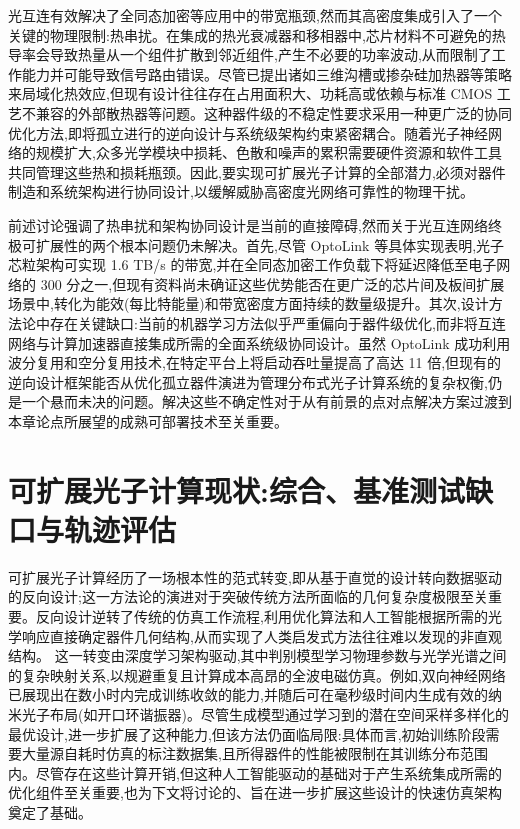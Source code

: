 \documentclass[11pt]{article}
\begin{document}
光互连有效解决了全同态加密等应用中的带宽瓶颈,然而其高密度集成引入了一个关键的物理限制:热串扰。在集成的热光衰减器和移相器中,芯片材料不可避免的热导率会导致热量从一个组件扩散到邻近组件,产生不必要的功率波动,从而限制了工作能力并可能导致信号路由错误。尽管已提出诸如三维沟槽或掺杂硅加热器等策略来局域化热效应,但现有设计往往存在占用面积大、功耗高或依赖与标准 CMOS 工艺不兼容的外部散热器等问题。这种器件级的不稳定性要求采用一种更广泛的协同优化方法,即将孤立进行的逆向设计与系统级架构约束紧密耦合。随着光子神经网络的规模扩大,众多光学模块中损耗、色散和噪声的累积需要硬件资源和软件工具共同管理这些热和损耗瓶颈。因此,要实现可扩展光子计算的全部潜力,必须对器件制造和系统架构进行协同设计,以缓解威胁高密度光网络可靠性的物理干扰。\citep{doi_10_1109_access_2020_3013116_8fec1fb2} \citep{doi_10_1145_3806395_315ab915} \citep{doi_10_3390_nano14080697_c372a140}

前述讨论强调了热串扰和架构协同设计是当前的直接障碍,然而关于光互连网络终极可扩展性的两个根本问题仍未解决。首先,尽管 OptoLink 等具体实现表明,光子芯粒架构可实现 1.6 TB/s 的带宽,并在全同态加密工作负载下将延迟降低至电子网络的 300 分之一,但现有资料尚未确证这些优势能否在更广泛的芯片间及板间扩展场景中,转化为能效(每比特能量)和带宽密度方面持续的数量级提升。其次,设计方法论中存在关键缺口:当前的机器学习方法似乎严重偏向于器件级优化,而非将互连网络与计算加速器直接集成所需的全面系统级协同设计。虽然 OptoLink 成功利用波分复用和空分复用技术,在特定平台上将启动吞吐量提高了高达 11 倍,但现有的逆向设计框架能否从优化孤立器件演进为管理分布式光子计算系统的复杂权衡,仍是一个悬而未决的问题。解决这些不确定性对于从有前景的点对点解决方案过渡到本章论点所展望的成熟可部署技术至关重要。\citep{doi_10_1145_3806395_315ab915}

\section{可扩展光子计算现状:综合、基准测试缺口与轨迹评估}\label{ux53efux6269ux5c55ux5149ux5b50ux8ba1ux7b97ux73b0ux72b6ux7efcux5408ux57faux51c6ux6d4bux8bd5ux7f3aux53e3ux4e0eux8f68ux8ff9ux8bc4ux4f30}

可扩展光子计算经历了一场根本性的范式转变,即从基于直觉的设计转向数据驱动的反向设计;这一方法论的演进对于突破传统方法所面临的几何复杂度极限至关重要。反向设计逆转了传统的仿真工作流程,利用优化算法和人工智能根据所需的光学响应直接确定器件几何结构,从而实现了人类启发式方法往往难以发现的非直观结构。\citep{doi_10_1117_12_3066105_d6297c38} \citep{doi_10_48550_arxiv_2506_18627_e2696034} 这一转变由深度学习架构驱动,其中判别模型学习物理参数与光学光谱之间的复杂映射关系,以规避重复且计算成本高昂的全波电磁仿真。例如,双向神经网络已展现出在数小时内完成训练收敛的能力,并随后可在毫秒级时间内生成有效的纳米光子布局(如开口环谐振器)。尽管生成模型通过学习到的潜在空间采样多样化的最优设计,进一步扩展了这种能力,但该方法仍面临局限:具体而言,初始训练阶段需要大量源自耗时仿真的标注数据集,且所得器件的性能被限制在其训练分布范围内。尽管存在这些计算开销,但这种人工智能驱动的基础对于产生系统集成所需的优化组件至关重要,也为下文将讨论的、旨在进一步扩展这些设计的快速仿真架构奠定了基础。\citep{doi_10_1515_nanoph_2021_0660_2d91a441} \citep{doi_10_1515_nanoph_2024_0536_4b6631ba}
\end{document}
